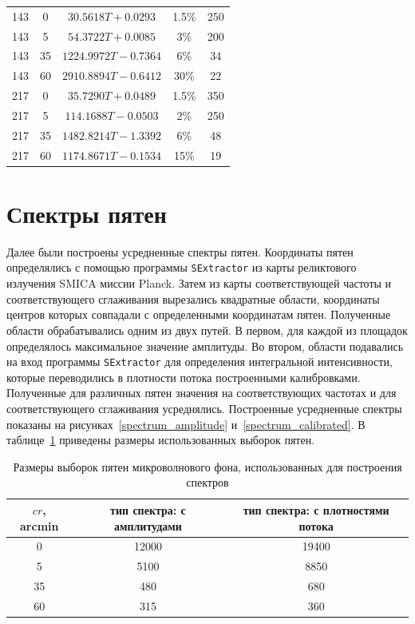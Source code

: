 \documentclass[12pt,a4paper]{extarticle}
\begin{document}
\begin{table}[h!]
\begin{tabular}{c|c|c|c|c}
		143 & 0 & $30.5618T+0.0293$ & 1.5\% & 250\\[3 pt]
		143 & 5 & $54.3722T+0.0085$ & 3\% & 200\\[3 pt]
		143 & 35 & $1224.9972T-0.7364$ & 6\% & 34\\[3 pt]
		143 & 60 & $2910.8894T-0.6412$ & 30\% & 22\\[3 pt]
		217 & 0 & $35.7290T+0.0489$ & 1.5\% & 350\\[3 pt]
		217 & 5 & $114.1688T-0.0503$ & 2\% & 250\\[3 pt]
		217 & 35 & $1482.8214T-1.3392$ & 6\% & 48\\[3 pt]
		217 & 60 & $1174.8671T-0.1534$ & 15\% & 19\\[3 pt]
	\end{tabular}
\end{table}

\section{Спектры пятен}
Далее были построены усредненные спектры пятен. Координаты пятен определялись с помощью программы \texttt{SExtractor} из карты реликтового излучения SMICA миссии Planck. Затем из карты соответствующей частоты и соответствующего сглаживания вырезались квадратные области, координаты центров которых совпадали с определенными координатам пятен. Полученные области обрабатывались одним из двух путей. В первом, для каждой из площадок определялось максимальное значение амплитуды. Во втором, области подавались на вход программы \texttt{SExtractor} для определения интегральной интенсивности, которые переводились в плотности потока построенными калибровками. Полученные для различных пятен значения на соответствующих частотах и для соответствующего сглаживания усреднялись. Построенные усредненные спектры показаны на рисунках~\ref{spectrum_amplitude} и~\ref{spectrum_calibrated}. В таблице~\ref{tab:nums_spectr} приведены размеры использованных выборок пятен.
	\begin{table}[h!]
		\setcaptionmargin{0mm}
		\caption{Размеры выборок пятен микроволнового фона, использованных для построения спектров}
		\label{tab:nums_spectr}
		\medskip
		\begin{tabular}{c|c|c}
			$cr$, arcmin & тип спектра: с амплитудами & тип спектра: с плотностями потока \\[3 pt] \hline
			0 & 12000 & 19400 \\[3 pt]
			5 & 5100 & 8850 \\[3 pt]
			35 & 480 & 680 \\[3 pt]
			60 & 315 & 360 \\[3 pt]
		\end{tabular}
	\end{table}
\end{document}
